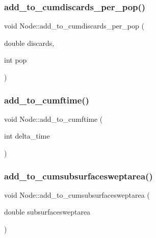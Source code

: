 \mbox{\label{class_node_aa0c85fff80790f92aec1ed711ff73456}} 
\subsubsection{\texorpdfstring{add\_to\_cumdiscards\_per\_pop()}{add\_to\_cumdiscards\_per\_pop()}}
{\footnotesize\ttfamily void Node\+::add\+\_\+to\+\_\+cumdiscards\+\_\+per\+\_\+pop (\begin{DoxyParamCaption}\item[{double}]{discards,  }\item[{int}]{pop }\end{DoxyParamCaption})}

\mbox{\label{class_node_af9f57c027b75b98740ebd4953229b5a8}} 
\subsubsection{\texorpdfstring{add\_to\_cumftime()}{add\_to\_cumftime()}}
{\footnotesize\ttfamily void Node\+::add\+\_\+to\+\_\+cumftime (\begin{DoxyParamCaption}\item[{int}]{delta\+\_\+time }\end{DoxyParamCaption})}

\mbox{\label{class_node_a65969247b42121fb3e6ae0ebadcec6c7}} 
\subsubsection{\texorpdfstring{add\_to\_cumsubsurfacesweptarea()}{add\_to\_cumsubsurfacesweptarea()}}
{\footnotesize\ttfamily void Node\+::add\+\_\+to\+\_\+cumsubsurfacesweptarea (\begin{DoxyParamCaption}\item[{double}]{subsurfacesweptarea }\end{DoxyParamCaption})}

\mbox{\label{class_node_a9d092fe950d7edbcf378ee0593a49535}} 
